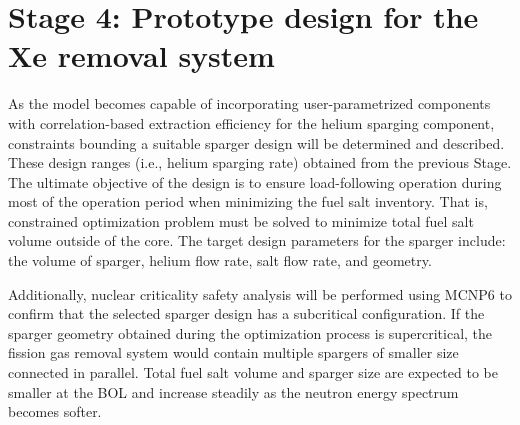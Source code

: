 \section{Stage 4: Prototype design for the Xe removal system}
As the model becomes capable of incorporating user-parametrized components 
with correlation-based extraction efficiency for the helium sparging 
component, constraints bounding a suitable sparger design will be determined 
and described. These design ranges (i.e., helium sparging rate) obtained from 
the previous Stage. The ultimate objective of the design is to ensure 
load-following operation during most of the operation period when 
minimizing the fuel salt inventory. That is, constrained optimization problem 
must be solved to minimize total fuel salt volume outside of the core. The 
target design parameters for the sparger include: the volume of sparger, 
helium flow rate, salt flow rate, and geometry.

Additionally, nuclear criticality safety analysis will be performed using 
MCNP6 \cite{werner_mcnp6._2018} to confirm that the selected sparger design 
has a subcritical configuration. If the sparger geometry obtained during the 
optimization process is supercritical, the fission gas removal system would 
contain multiple spargers of smaller size connected in parallel. Total fuel 
salt volume and sparger size are expected to be smaller at the \gls{BOL} and 
increase steadily as the neutron energy spectrum becomes softer.


